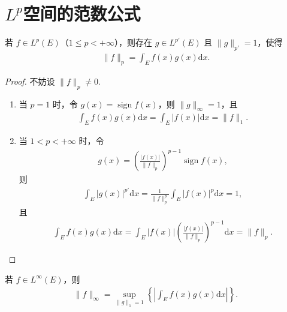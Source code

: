 \documentclass[../../main.tex]{subfiles}%
\begin{document}
\section{$L^p$空间的范数公式}

\begin{theorem}
若 $f\in L^p(E)$（$1\leqslant p<+\infty$），则存在 $g\in L^{p'}(E)$ 且 $\|g\|_{p'}=1$，使得
\begin{align}
\|f\|_p = \int_E f(x)g(x)\mathrm{d}x. \label{eq::8u238rURU32ur8-9}
\end{align}
\end{theorem}
\begin{proof}

不妨设 $\|f\|_p \neq 0$.
\begin{enumerate}[(1)]
\item 当 $p=1$ 时，令 $g(x)=\operatorname{sign} f(x)$，则 $\|g\|_\infty=1$，且
\begin{align*}
\int_E f(x)g(x)\mathrm{d}x = \int_E |f(x)|\mathrm{d}x = \|f\|_1.
\end{align*}

\item 当 $1<p<+\infty$ 时，令
\begin{align*}
g(x) = \left( \frac{|f(x)|}{\|f\|_p} \right)^{p-1} \operatorname{sign} f(x),
\end{align*}
则
\begin{align*}
\int_E |g(x)|^{p'} \mathrm{d}x = \frac{1}{\|f\|_p^p} \int_E |f(x)|^p \mathrm{d}x = 1,
\end{align*}
且
\begin{align*}
\int_E f(x)g(x)\mathrm{d}x = \int_E |f(x)| \left( \frac{|f(x)|}{\|f\|_p} \right)^{p-1} \mathrm{d}x = \|f\|_p.
\end{align*}
\end{enumerate}

\end{proof}

\begin{theorem}
若 $f\in L^\infty(E)$，则
\begin{align*}
\|f\|_\infty = \sup_{\|g\|_1=1} \left\{ \left| \int_E f(x)g(x)\mathrm{d}x \right| \right\}.
\end{align*}
\end{theorem}
\end{document}
